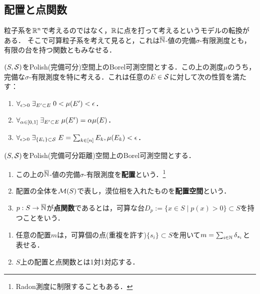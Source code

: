 \documentclass[uplatex,dvipdfmx]{jsreport}
\begin{document}
\subsection{配置と点関数}

\begin{tcolorbox}[colframe=ForestGreen, colback=ForestGreen!10!white,breakable,colbacktitle=ForestGreen!40!white,coltitle=black,fonttitle=\bfseries\sffamily,
title=]
    粒子系を$\R^n$で考えるのではなく，$\R$に点を打って考えるというモデルの転換がある．
    そこで可算粒子系を考えて見ると，これは$\o{\N}$-値の完備$\sigma$-有限測度とも，有限の台を持つ関数ともみなせる．
\end{tcolorbox}

\begin{lemma}
    $(S,\S)$をPolish(完備可分)空間上のBorel可測空間とする．この上の測度$\mu$のうち，
    完備な$\sigma$-有限測度を特に考える．これは任意の$E\in\S$に対して次の性質を満たす：
    \begin{enumerate}
        \item $\forall_{\ep>0}\;\exists_{E'\subset E}\;0<\mu(E')<\ep$．
        \item $\forall_{\al\in[0,1]}\;\exists_{E'\subset E}\;\mu(E')=\al\mu(E)$．
        \item $\forall_{\ep>0}\;\exists_{\{E_i\}\subset\S}\;E=\sum_{k\in[n]}E_k,\mu(E_k)<\ep$．
    \end{enumerate}
\end{lemma}

\begin{definition}
    $(S,\S)$をPolish(完備可分距離)空間上のBorel可測空間とする．
    \begin{enumerate}
        \item この上の$\o{\N}$-値の完備$\sigma$-有限測度を\textbf{配置}という．\footnote{Radon測度に制限することもある．}
        \item 配置の全体を$\M(S)$で表し，漠位相を入れたものを\textbf{配置空間}という．
        \item $p:S\to\o{\N}$が\textbf{点関数}であるとは，可算な台$D_p:=\{x\in S\mid p(x)>0\}\subset S$を持つことをいう．
    \end{enumerate}
\end{definition}

\begin{lemma}\mbox{}
    \begin{enumerate}
        \item 任意の配置$m$は，可算個の点(重複を許す)$\{s_i\}\subset S$を用いて$m=\sum_{i\in\N}\delta_{s_i}$と表せる．
        \item $S$上の配置と点関数とは1対1対応する．
    \end{enumerate}
\end{lemma}
\end{document}
